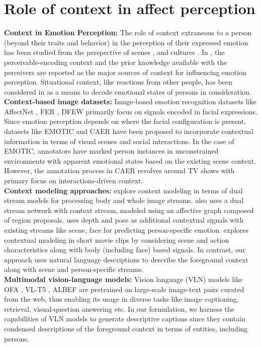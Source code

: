 \section{Role of context in affect perception}
\textbf{Context in Emotion Perception:} The role of context extraneous to a person (beyond their traits and behavior) in the perception of their expressed emotion has been studied from the perspective of scenes \cite{BarretEmotionPerception}, and cultures \cite{Masuda2008PlacingTF}. In \cite{Dudzik2019ContextIH}, the perceivable-encoding context and the prior knowledge available with the perceivers are reported as the major sources of context for influencing emotion perception.  Situational context, like reactions from other people, has been considered in \cite{Wieser2012FacesIC} as a means to decode emotional states of persons in consideration.\\
\textbf{Context-based image datasets:} Image-based emotion recognition datasets like AffectNet \cite{AffectNet}, FER \cite{BarsoumICMI2016}, DFEW \cite{DFEW} primarily focus on signals encoded in facial expressions. Since emotion perception depends on where the facial configuration is present, datasets like EMOTIC \cite{kostiPAMI} and CAER \cite{CAER-S} have been proposed to incorporate contextual information in terms of visual scenes and social interactions. In the case of EMOTIC, annotators have marked person instances in unconstrained environments with apparent emotional states based on the existing scene context. However, the annotation process in CAER revolves around TV shows with primary focus on interactions-driven context. 
\\
\textbf{Context modeling approaches:} 
\cite{kostiPAMI,CAER-S} explore context modeling in terms of dual stream models for processing body and whole image streams. \cite{CAGER} also uses a dual stream network with context stream, modeled using an affective graph composed of region proposals.\cite{Mittal2020EmotiConCM} uses depth and pose as additional contextual signals with existing streams like scene, face for predicting person-specific emotion.
\cite{pikoulis2021leveraging} explores contextual modeling in short movie clips by considering scene and action characteristics along with body (including face) based signals. In contrast, our approach uses natural language descriptions to describe the foreground context along with scene and person-specific streams.
\\
\textbf{Multimodal vision-language models:} Vision language (VLN) models like OFA \cite{wang2022ofa}, VL-T5 \cite{cho2021vlt5}, ALBEF \cite{ALBEF} are pretrained on large-scale image-text pairs curated from the web, thus enabling its usage in diverse tasks like image captioning, retrieval, visual-question answering etc. In our formulation, we harness the capabilities of VLN models to generate descriptive captions since they contain condensed descriptions of the foreground context in terms of entities, including persons.

